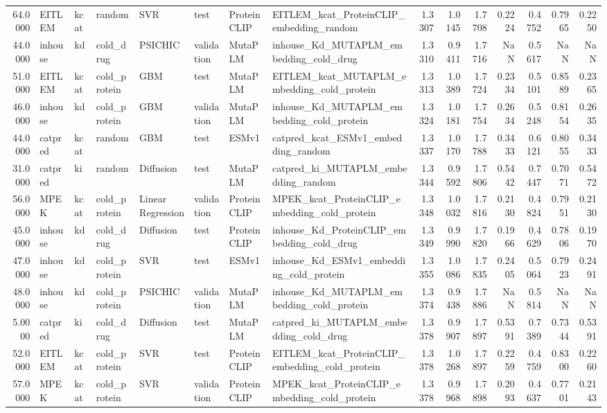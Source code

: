 \begin{tabular}{rlllllllrrrrrrr}
64.0000 & EITLEM & kcat & random & SVR & test & ProteinCLIP & EITLEM_kcat_ProteinCLIP_embedding_random & 1.3307 & 1.0145 & 1.7708 & 0.2224 & 0.4752 & 0.7965 & 0.2250 \\
44.0000 & inhouse & kd & cold_drug & PSICHIC & validation & MutaPLM & inhouse_Kd_MUTAPLM_embedding_cold_drug & 1.3310 & 0.9411 & 1.7716 & NaN & 0.5617 & NaN & NaN \\
51.0000 & EITLEM & kcat & cold_protein & GBM & test & MutaPLM & EITLEM_kcat_MUTAPLM_embedding_cold_protein & 1.3313 & 1.0389 & 1.7724 & 0.2334 & 0.5101 & 0.8589 & 0.2365 \\
46.0000 & inhouse & kd & cold_protein & GBM & validation & MutaPLM & inhouse_Kd_MUTAPLM_embedding_cold_protein & 1.3324 & 1.0181 & 1.7754 & 0.2634 & 0.5248 & 0.8154 & 0.2635 \\
44.0000 & catpred & kcat & random & GBM & test & ESMv1 & catpred_kcat_ESMv1_embedding_random & 1.3337 & 1.0170 & 1.7788 & 0.3433 & 0.6121 & 0.8055 & 0.3433 \\
31.0000 & catpred & ki & random & Diffusion & test & MutaPLM & catpred_ki_MUTAPLM_embedding_random & 1.3344 & 0.9592 & 1.7806 & 0.5442 & 0.7447 & 0.7071 & 0.5472 \\
56.0000 & MPEK & kcat & cold_protein & Linear Regression & validation & ProteinCLIP & MPEK_kcat_ProteinCLIP_embedding_cold_protein & 1.3348 & 1.0032 & 1.7816 & 0.2130 & 0.4824 & 0.7951 & 0.2130 \\
45.0000 & inhouse & kd & cold_drug & Diffusion & test & ProteinCLIP & inhouse_Kd_ProteinCLIP_embedding_cold_drug & 1.3349 & 0.9990 & 1.7820 & 0.1966 & 0.4629 & 0.7806 & 0.1970 \\
47.0000 & inhouse & kd & cold_protein & SVR & test & ESMv1 & inhouse_Kd_ESMv1_embedding_cold_protein & 1.3355 & 1.0086 & 1.7835 & 0.2405 & 0.5064 & 0.7923 & 0.2491 \\
48.0000 & inhouse & kd & cold_protein & PSICHIC & validation & MutaPLM & inhouse_Kd_MUTAPLM_embedding_cold_protein & 1.3374 & 0.9438 & 1.7886 & NaN & 0.5814 & NaN & NaN \\
5.0000 & catpred & ki & cold_drug & Diffusion & test & MutaPLM & catpred_ki_MUTAPLM_embedding_cold_drug & 1.3378 & 0.9907 & 1.7897 & 0.5391 & 0.7389 & 0.7344 & 0.5391 \\
52.0000 & EITLEM & kcat & cold_protein & SVR & test & ProteinCLIP & EITLEM_kcat_ProteinCLIP_embedding_cold_protein & 1.3378 & 1.0268 & 1.7897 & 0.2259 & 0.4759 & 0.8300 & 0.2260 \\
57.0000 & MPEK & kcat & cold_protein & SVR & validation & ProteinCLIP & MPEK_kcat_ProteinCLIP_embedding_cold_protein & 1.3378 & 0.9968 & 1.7898 & 0.2093 & 0.4637 & 0.7701 & 0.2143 \\

\end{tabular}
